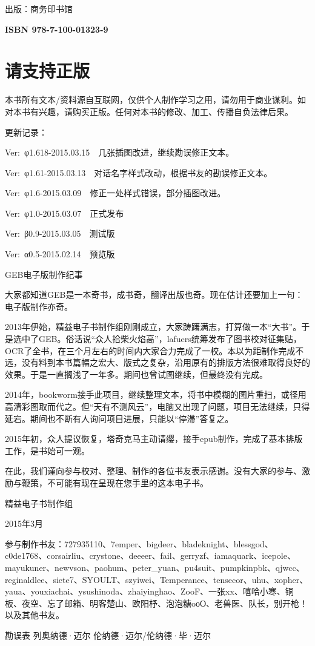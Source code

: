 \documentclass[
  12pt,
  twoside,
  openright,
  oldfontcommands,
]{memoir}
\newcommand{\westerntext}[1]{{\rmfamily #1}}
\begin{document}
出版：商务印书馆

\textbf{ISBN 978-7-100-01323-9}

\chapter{请支持正版}

本书所有文本/资料源自互联网，仅供个人制作学习之用，请勿用于商业谋利。如对本书有兴趣，请购买正版。任何对本书的修改、加工、传播自负法律后果。

更新记录：

Ver:~\westerntext{φ}1.618-2015.03.15　几张插图改进，继续勘误修正文本。

Ver:~\westerntext{φ}1.61-2015.03.13　对话名字样式改动，根据书友的勘误修正文本。

Ver:~\westerntext{φ}1.6-2015.03.09　修正一处样式错误，部分插图改进。

Ver:~\westerntext{φ}1.0-2015.03.07　正式发布

Ver:~\westerntext{β}0.9-2015.03.05　测试版

Ver:~\westerntext{α}0.5-2015.02.14　预览版

\label{Info_split_001.xhtml}{}

\label{Info_split_001.xhtml_calibre_pb_0}
GEB电子版制作纪事

大家都知道GEB是一本奇书，成书奇，翻译出版也奇。现在估计还要加上一句：电子版制作亦奇。

2013年伊始，精益电子书制作组刚刚成立，大家踌躇满志，打算做一本``大书''。于是选中了GEB。俗话说``众人拾柴火焰高''，lafuers统筹发布了图书校对征集贴，OCR了全书，在三个月左右的时间内大家合力完成了一校。本以为距制作完成不远，没有料到本书篇幅之宏大、版式之复杂，沿用原有的排版方法很难取得良好的效果。于是一直搁浅了一年多。期间也曾试图继续，但最终没有完成。

2014年，bookworm接手此项目，继续整理文本，将书中模糊的图片重扫，或径用高清彩图取而代之。但``天有不测风云''，电脑又出现了问题，项目无法继续，只得延宕。期间也不断有人询问项目进展，只能以``停滞''答复之。

2015年初，众人提议恢复，塔奇克马主动请缨，接手epub制作，完成了基本排版工作，是书始可一观。

在此，我们谨向参与校对、整理、制作的各位书友表示感谢。没有大家的参与、激励与鞭策，不可能有现在呈现在您手里的这本电子书。

精益电子书制作组

2015年3月

参与制作书友：727935110、7emper、bigdeer、bladeknight、blessgod、c0de1768、corsairliu、crystone、deeeer、fail、gerryzf、iamaquark、icepole、mayukuner、newvson、paohum、peter\_yuan、pu4suit、pumpkinpbk、qjwcc、reginaldlee、siete7、SYOULT、szyiwei、Temperance、tensecor、uhu、xopher、yaua、youxiachai、ysushinoda、zhaiyinghao、ZooF、一张xx、嘻哈小寒、铜板、夜空、忘了邮箱、明客楚山、欧阳杼、泡泡糖oоО、老兽医、队长，别开枪！以及其他书友。

勘误表 列奥纳德·迈尔 伦纳德·迈尔/伦纳德·毕·迈尔
\end{document}

